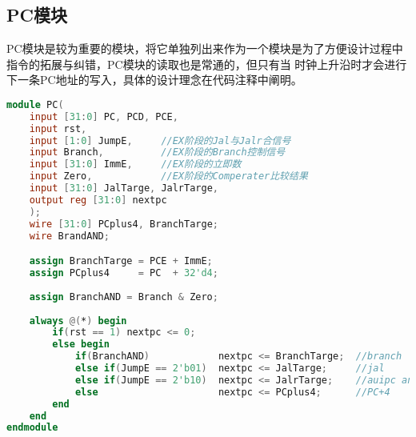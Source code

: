 \subsection{PC模块}
PC模块是较为重要的模块，将它单独列出来作为一个模块是为了方便设计过程中指令的拓展与纠错，PC模块的读取也是常通的，但只有当
时钟上升沿时才会进行下一条PC地址的写入，具体的设计理念在代码注释中阐明。
\begin{lstlisting}[language = {verilog}]
module PC(
    input [31:0] PC, PCD, PCE,
    input rst,
    input [1:0] JumpE,     //EX阶段的Jal与Jalr合信号
    input Branch,          //EX阶段的Branch控制信号
    input [31:0] ImmE,     //EX阶段的立即数
    input Zero,            //EX阶段的Comperater比较结果   
    input [31:0] JalTarge, JalrTarge,
    output reg [31:0] nextpc
    );
    wire [31:0] PCplus4, BranchTarge;
    wire BrandAND;

    assign BranchTarge = PCE + ImmE;
    assign PCplus4     = PC  + 32'd4;            
    
    assign BranchAND = Branch & Zero;  
    
    always @(*) begin
        if(rst == 1) nextpc <= 0;
        else begin
            if(BranchAND)            nextpc <= BranchTarge;  //branch   
            else if(JumpE == 2'b01)  nextpc <= JalTarge;     //jal 
            else if(JumpE == 2'b10)  nextpc <= JalrTarge;    //auipc and jalr
            else                     nextpc <= PCplus4;      //PC+4
        end
    end
endmodule
\end{lstlisting}

